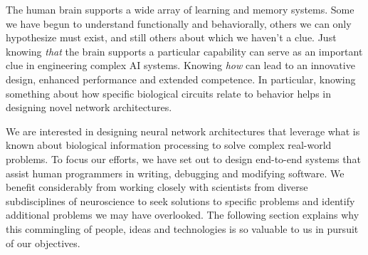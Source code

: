 

The human brain supports a wide array of learning and memory systems. Some we have begun to understand functionally and behaviorally, others we can only hypothesize must exist, and still others about which we haven't a clue. Just knowing {\it{that}} the brain supports a particular capability can serve as an important clue in engineering complex AI systems. Knowing {\it{how}} can lead to an innovative design, enhanced performance and extended competence. In particular, knowing something about how specific biological circuits relate to behavior helps in designing novel network architectures.

We are interested in designing neural network architectures that leverage what is known about biological information processing to solve complex real-world problems. To focus our efforts, we have set out to design end-to-end systems that assist human programmers in writing, debugging and modifying software. We benefit considerably from working closely with scientists from diverse subdisciplines of neuroscience to seek solutions to specific problems and identify additional problems we may have overlooked. The following section explains why this commingling of people, ideas and technologies is so valuable to us in pursuit of our objectives.


